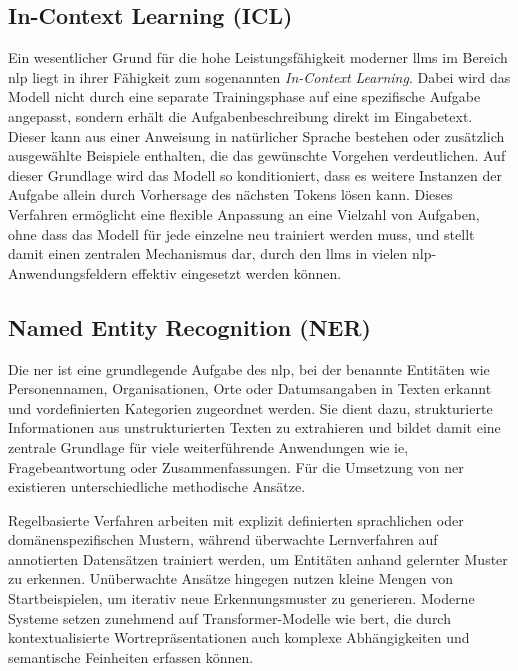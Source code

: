 
\subsection{In-Context Learning (ICL)}\label{subsec:in-context-learning}

Ein wesentlicher Grund für die hohe Leistungsfähigkeit moderner \glspl{llm} im Bereich \gls{nlp} liegt in ihrer Fähigkeit zum sogenannten \emph{In-Context Learning}.
Dabei wird das Modell nicht durch eine separate Trainingsphase auf eine spezifische Aufgabe angepasst, sondern erhält die Aufgabenbeschreibung direkt im Eingabetext.
Dieser kann aus einer Anweisung in natürlicher Sprache bestehen oder zusätzlich ausgewählte Beispiele enthalten, die das gewünschte Vorgehen verdeutlichen.
Auf dieser Grundlage wird das Modell so konditioniert, dass es weitere Instanzen der Aufgabe allein durch Vorhersage des nächsten Tokens lösen kann.
Dieses Verfahren ermöglicht eine flexible Anpassung an eine Vielzahl von Aufgaben, ohne dass das Modell für jede einzelne neu trainiert werden muss, und stellt damit einen zentralen Mechanismus dar, durch den \glspl{llm} in vielen \gls{nlp}-Anwendungsfeldern effektiv eingesetzt werden können\autocite{brown_language_2020}.


\subsection{Named Entity Recognition (NER)}

Die \gls{ner} ist eine grundlegende Aufgabe des \gls{nlp}, bei der benannte Entitäten wie Personennamen, Organisationen, Orte oder Datumsangaben in Texten erkannt und vordefinierten Kategorien zugeordnet werden.
Sie dient dazu, strukturierte Informationen aus unstrukturierten Texten zu extrahieren und bildet damit eine zentrale Grundlage für viele weiterführende Anwendungen wie \gls{ie}, Fragebeantwortung oder Zusammenfassungen.
Für die Umsetzung von \gls{ner} existieren unterschiedliche methodische Ansätze\autocite{pakhale_comprehensive_2023}.

Regelbasierte Verfahren arbeiten mit explizit definierten sprachlichen oder domänenspezifischen Mustern, während überwachte Lernverfahren auf annotierten Datensätzen trainiert werden, um Entitäten anhand gelernter Muster zu erkennen.
Unüberwachte Ansätze hingegen nutzen kleine Mengen von Startbeispielen, um iterativ neue Erkennungsmuster zu generieren.
Moderne Systeme setzen zunehmend auf Transformer-Modelle wie \gls{bert}, die durch kontextualisierte Wortrepräsentationen auch komplexe Abhängigkeiten und semantische Feinheiten erfassen können\autocite{pakhale_comprehensive_2023}.

